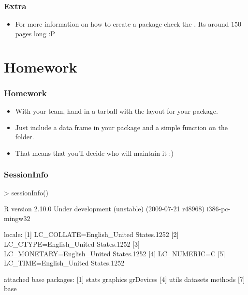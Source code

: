 \begin{frame}[allowframebreaks]
  \frametitle{Extra}
  \begin{itemize}
  \item For more information on how to create a package check the . Its around 150 pages long :P
  \end{itemize}
\end{frame}



\section{Homework}
\begin{frame}[allowframebreaks]
  \frametitle{Homework}
  \begin{itemize}
  \item With your team, hand in a tarball with the layout for your package.
  \item Just include a data frame in your package and a simple function on the  folder. 
  \item That means that you'll decide who will maintain it :)
  \end{itemize}
\end{frame}

\begin{frame}
  \frametitle{SessionInfo} \scriptsize
\begin{Schunk}
\begin{Sinput}
> sessionInfo()
\end{Sinput}
\begin{Soutput}
R version 2.10.0 Under development (unstable) (2009-07-21 r48968) 
i386-pc-mingw32 

locale:
[1] LC_COLLATE=English_United States.1252 
[2] LC_CTYPE=English_United States.1252   
[3] LC_MONETARY=English_United States.1252
[4] LC_NUMERIC=C                          
[5] LC_TIME=English_United States.1252    

attached base packages:
[1] stats     graphics  grDevices
[4] utils     datasets  methods  
[7] base     
\end{Soutput}
\end{Schunk}
\end{frame}



